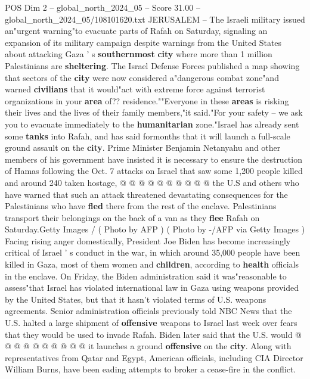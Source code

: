 \begin{textsample}{POS Dim 2 – global\_north\_2024\_05 – Score 31.00 – global\_north\_2024\_05/108101620.txt}  \label{ex:f2_pos_295}
JERUSALEM -- The Israeli military issued an"urgent warning"to evacuate parts of Rafah on Saturday, signaling an expansion of its military campaign despite warnings from the United States about attacking Gaza ' s \textbf{southernmost} \textbf{city} where more than 1 million Palestinians are \textbf{sheltering}.
The Israel Defense Forces published a map showing that sectors of the \textbf{city} were now considered a"dangerous combat zone"and warned \textbf{civilians} that it would"act with extreme force against terrorist organizations in your \textbf{area} of?? residence.""Everyone in these \textbf{areas} is risking their lives and the lives of their family members,"it said."For your safety -- we ask you to evacuate immediately to the \textbf{humanitarian} zone."Israel has already sent some \textbf{tanks} into Rafah, and has said formonths that it will launch a full-scale ground assault on the \textbf{city}.
Prime Minister Benjamin Netanyahu and other members of his government have insisted it is necessary to ensure the destruction of Hamas following the Oct. 7 attacks on Israel that saw some 1,200 people killed and around 240 taken hostage, @ @ @ @ @ @ @ @ @ @ the U.S and others who have warned that such an attack threatened devastating consequences for the Palestinians who have \textbf{fled} there from the rest of the enclave.
Palestinians transport their belongings on the back of a van as they \textbf{flee} Rafah on Saturday.Getty Images / ( Photo by AFP ) ( Photo by -/AFP via Getty Images ) Facing rising anger domestically, President Joe Biden has become increasingly critical of Israel ' s conduct in the war, in which around 35,000 people have been killed in Gaza, most of them women and \textbf{children}, according to \textbf{health} officials in the enclave.
On Friday, the Biden administration said it was"reasonable to assess"that Israel has violated international law in Gaza using weapons provided by the United States, but that it hasn't violated terms of U.S. weapons agreements.
Senior administration officials previously told NBC News that the U.S. halted a large shipment of \textbf{offensive} weapons to Israel last week over fears that they would be used to invade Rafah.
Biden later said that the U.S. would @ @ @ @ @ @ @ @ @ @ it launches a ground \textbf{offensive} on the \textbf{city}.
Along with representatives from Qatar and Egypt, American officials, including CIA Director William Burns, have been eading attempts to broker a cease-fire in the conflict.

\end{textsample}
